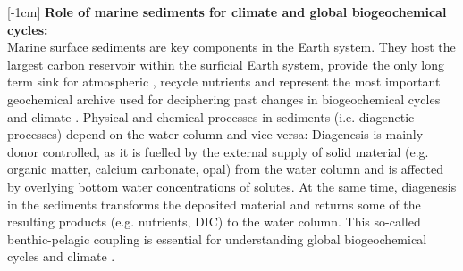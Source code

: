 \documentclass[gmd, manuscript]{copernicus}
\begin{document}
\introduction  %
[-1cm]%
\textbf{Role of marine sediments for climate and global biogeochemical cycles:}\\
Marine surface sediments are key components in the Earth system. They host the largest carbon reservoir within the surficial Earth system, provide the only long term sink for atmospheric , 
recycle nutrients and represent the most important geochemical archive used for deciphering past changes in biogeochemical cycles and climate  \citep[e.g.][]{berner:91, archer_effect_1994, ridgwell_role_2005, arndt_quantifying_2013}. 
Physical and chemical processes in sediments (i.e. diagenetic processes) depend on the water column and vice versa: Diagenesis is mainly donor controlled, as it is fuelled by the external supply of solid material 
(e.g. organic matter, calcium carbonate, opal) from the water column and is affected by overlying bottom water concentrations of solutes. 
At the same time, diagenesis in the sediments transforms the deposited material and returns some of the resulting products (e.g. nutrients, DIC) to the water column. 
This so-called benthic-pelagic coupling is essential for understanding global biogeochemical cycles and climate \citep[e.g.][]{archer_effect_1994, archer_what_2000, soetaert_coupling_2000, mackenzie_sediments_2005}. 
\end{document}
